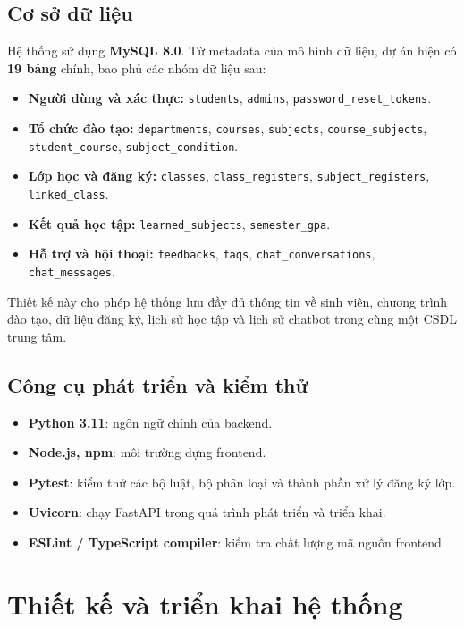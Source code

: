 \documentclass[12pt,a4paper]{report}
\begin{document}
\section{Cơ sở dữ liệu}
Hệ thống sử dụng \textbf{MySQL 8.0}. Từ metadata của mô hình dữ liệu, dự án hiện có \textbf{19 bảng} chính, bao phủ các nhóm dữ liệu sau:
\begin{itemize}
    \item \textbf{Người dùng và xác thực:} \texttt{students}, \texttt{admins}, \texttt{password\_reset\_tokens}.
    \item \textbf{Tổ chức đào tạo:} \texttt{departments}, \texttt{courses}, \texttt{subjects}, \texttt{course\_subjects}, \texttt{student\_course}, \texttt{subject\_condition}.
    \item \textbf{Lớp học và đăng ký:} \texttt{classes}, \texttt{class\_registers}, \texttt{subject\_registers}, \texttt{linked\_class}.
    \item \textbf{Kết quả học tập:} \texttt{learned\_subjects}, \texttt{semester\_gpa}.
    \item \textbf{Hỗ trợ và hội thoại:} \texttt{feedbacks}, \texttt{faqs}, \texttt{chat\_conversations}, \texttt{chat\_messages}.
\end{itemize}

Thiết kế này cho phép hệ thống lưu đầy đủ thông tin về sinh viên, chương trình đào tạo, dữ liệu đăng ký, lịch sử học tập và lịch sử chatbot trong cùng một CSDL trung tâm.

\section{Công cụ phát triển và kiểm thử}
\begin{itemize}
    \item \textbf{Python 3.11}: ngôn ngữ chính của backend.
    \item \textbf{Node.js, npm}: môi trường dựng frontend.
    \item \textbf{Pytest}: kiểm thử các bộ luật, bộ phân loại và thành phần xử lý đăng ký lớp.
    \item \textbf{Uvicorn}: chạy FastAPI trong quá trình phát triển và triển khai.
    \item \textbf{ESLint / TypeScript compiler}: kiểm tra chất lượng mã nguồn frontend.
\end{itemize}

\chapter{Thiết kế và triển khai hệ thống}
\end{document}
